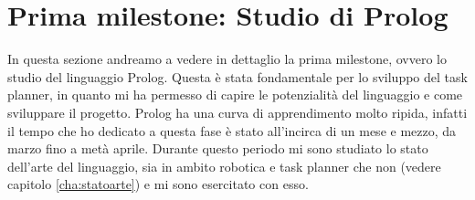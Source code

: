 \section{Prima milestone: Studio di Prolog}
\label{sec:studioprolog}
In questa sezione andreamo a vedere in dettaglio la prima milestone, ovvero lo studio del linguaggio Prolog. Questa è stata fondamentale per lo sviluppo del task planner, in quanto mi ha permesso di capire le potenzialità del linguaggio e come sviluppare il progetto.
Prolog ha una curva di apprendimento molto ripida, infatti il tempo che ho dedicato a questa fase è stato all'incirca di un mese e mezzo, da marzo fino a metà aprile.
Durante questo periodo mi sono studiato lo stato dell'arte del linguaggio, sia in ambito robotica e task planner che non (vedere capitolo \ref{cha:statoarte}) e mi sono esercitato con esso.

